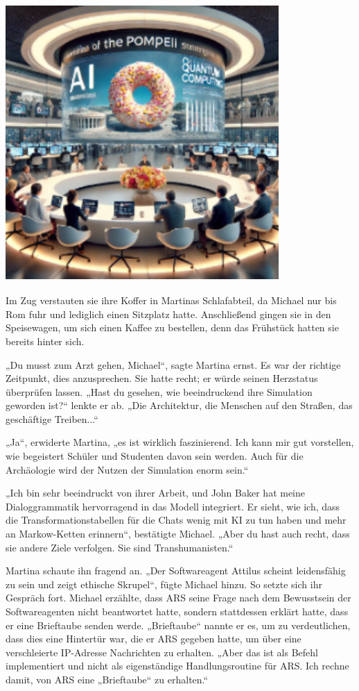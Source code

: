 \documentclass[
]{article}
\begin{document}
\includegraphics[width=4.10876in,height=4.16184in]{media/image13.png}

Im Zug verstauten sie ihre Koffer in Martinas Schlafabteil, da Michael
nur bis Rom fuhr und lediglich einen Sitzplatz hatte. Anschließend
gingen sie in den Speisewagen, um sich einen Kaffee zu bestellen, denn
das Frühstück hatten sie bereits hinter sich.

„Du musst zum Arzt gehen, Michael``, sagte Martina ernst. Es war der
richtige Zeitpunkt, dies anzusprechen. Sie hatte recht; er würde seinen
Herzstatus überprüfen lassen. „Hast du gesehen, wie beeindruckend ihre
Simulation geworden ist?{\kern0pt}`` lenkte er ab. „Die Architektur, die
Menschen auf den Straßen, das geschäftige Treiben...``

„Ja``, erwiderte Martina, „es ist wirklich faszinierend. Ich kann mir
gut vorstellen, wie begeistert Schüler und Studenten davon sein werden.
Auch für die Archäologie wird der Nutzen der Simulation enorm sein.``

„Ich bin sehr beeindruckt von ihrer Arbeit, und John Baker hat meine
Dialoggrammatik hervorragend in das Modell integriert. Er sieht, wie
ich, dass die Transformationstabellen für die Chats wenig mit KI zu tun
haben und mehr an Markow-Ketten erinnern``, bestätigte Michael. „Aber du
hast auch recht, dass sie andere Ziele verfolgen. Sie sind
Transhumanisten.``

Martina schaute ihn fragend an. „Der Softwareagent Attilus scheint
leidensfähig zu sein und zeigt ethische Skrupel``, fügte Michael hinzu.
So setzte sich ihr Gespräch fort. Michael erzählte, dass ARS seine Frage
nach dem Bewusstsein der Softwareagenten nicht beantwortet hatte,
sondern stattdessen erklärt hatte, dass er eine Brieftaube senden werde.
„Brieftaube`` nannte er es, um zu verdeutlichen, dass dies eine
Hintertür war, die er ARS gegeben hatte, um über eine verschleierte
IP-Adresse Nachrichten zu erhalten. „Aber das ist als Befehl
implementiert und nicht als eigenständige Handlungsroutine für ARS. Ich
rechne damit, von ARS eine „Brieftaube`` zu erhalten.``
\end{document}
